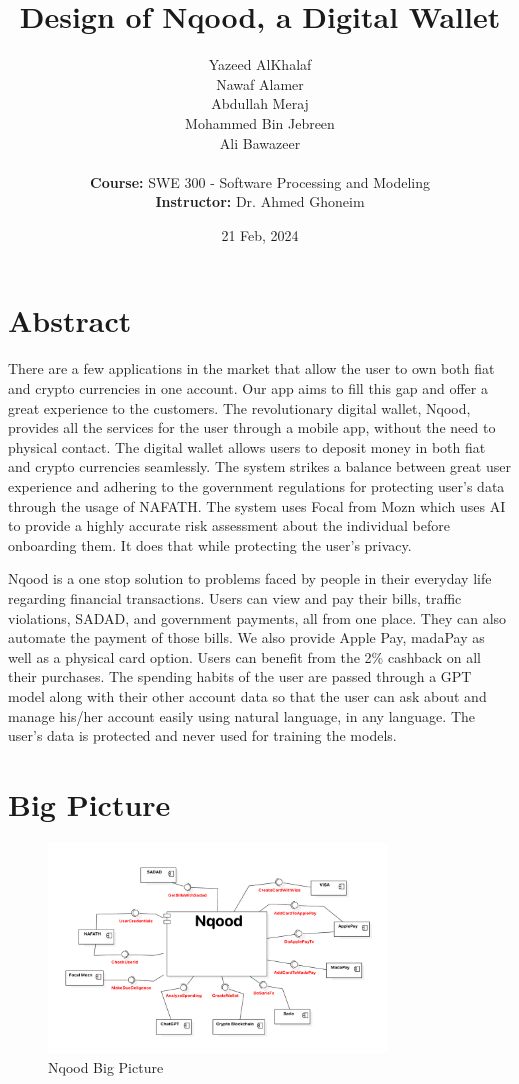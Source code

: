 \documentclass[a4paper]{report}
\title{Design of Nqood, a Digital Wallet}
\author{
    Yazeed AlKhalaf \\
    Nawaf Alamer  \\
    Abdullah Meraj \\
    Mohammed Bin Jebreen \\
    Ali Bawazeer \\
    \\
    \textbf{Course:} SWE 300 - Software Processing and Modeling \\
    \textbf{Instructor:} Dr. Ahmed Ghoneim
}
\date{21 Feb, 2024}
\begin{document}
\maketitle

\newpage

\tableofcontents

\chapter*{Abstract}

There are a few applications in the market that allow the user to own both fiat and crypto currencies in one account. Our app aims to fill this gap and offer a great experience to the customers. The revolutionary digital wallet, Nqood, provides all the services for the user through a mobile app, without the need to physical contact. The digital wallet allows users to deposit money in both fiat and crypto currencies seamlessly. The system strikes a balance between great user experience and adhering to the government regulations for protecting user’s data through the usage of NAFATH. The system uses Focal from Mozn which uses AI to provide a highly accurate risk assessment about the individual before onboarding them. It does that while protecting the user’s privacy.

Nqood is a one stop solution to problems faced by people in their everyday life regarding financial transactions. Users can view and pay their bills, traffic violations, SADAD, and government payments, all from one place. They can also automate the payment of those bills. We also provide Apple Pay, madaPay as well as a physical card option. Users can benefit from the 2\% cashback on all their purchases. The spending habits of the user are passed through a GPT model along with their other account data so that the user can ask about and manage his/her account easily using natural language, in any language. The user’s data is protected and never used for training the models.

\chapter{Big Picture}

\begin{figure}[h!]
    \centering
    \includegraphics[width=0.8\textwidth]{images/nqood-big-picture.png}
    \caption{Nqood Big Picture}
    \label{fig:big-picture}
\end{figure}
\end{document}
